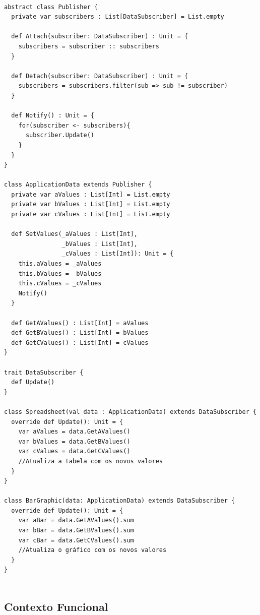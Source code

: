 \begin{lstlisting}[caption={Observer Orientação a Objetos},label=ooobserver]

abstract class Publisher {
  private var subscribers : List[DataSubscriber] = List.empty

  def Attach(subscriber: DataSubscriber) : Unit = {
    subscribers = subscriber :: subscribers
  }

  def Detach(subscriber: DataSubscriber) : Unit = {
    subscribers = subscribers.filter(sub => sub != subscriber)
  }

  def Notify() : Unit = {
    for(subscriber <- subscribers){
      subscriber.Update()
    }
  }
}

class ApplicationData extends Publisher {
  private var aValues : List[Int] = List.empty
  private var bValues : List[Int] = List.empty
  private var cValues : List[Int] = List.empty

  def SetValues(_aValues : List[Int],
                _bValues : List[Int],
                _cValues : List[Int]): Unit = {
    this.aValues = _aValues
    this.bValues = _bValues
    this.cValues = _cValues
    Notify()
  }

  def GetAValues() : List[Int] = aValues
  def GetBValues() : List[Int] = bValues
  def GetCValues() : List[Int] = cValues
}

trait DataSubscriber {
  def Update()
}

class Spreadsheet(val data : ApplicationData) extends DataSubscriber {
  override def Update(): Unit = {
    var aValues = data.GetAValues()
    var bValues = data.GetBValues()
    var cValues = data.GetCValues()
    //Atualiza a tabela com os novos valores
  }
}

class BarGraphic(data: ApplicationData) extends DataSubscriber {
  override def Update(): Unit = {
    var aBar = data.GetAValues().sum
    var bBar = data.GetBValues().sum
    var cBar = data.GetCValues().sum
    //Atualiza o gráfico com os novos valores
  }
}
    
\end{lstlisting}

\subsection*{Contexto Funcional}


\begin{lstlisting}[caption={Observer Funcional},label=fpobserver]
    

    
\end{lstlisting}